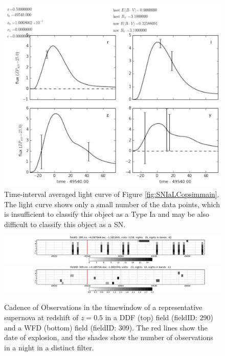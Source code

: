 \begin{figure}[tbh!]
\includegraphics[angle=0,width=0.99\hsize:,clip]{figs/SN_309_lcavg.pdf}
\caption{Time-interval averaged light curve of Figure \ref{fig:SNIaLCopsimmain}.
The light curve shows only a small number of the data points, which is insufficient
to classify this object as a Type Ia and may be also difficult to classify this object as
a SN. 
}
\label{fig:SNIaLCopsimmain2}
\end{figure}



\begin{figure}[tbh!]
\includegraphics[angle=0,width=\textwidth,clip]{figs/SN_Cadence_290.pdf}
\includegraphics[angle=0,width=\textwidth,clip]{figs/SN_Cadence_309.pdf}
\caption{Cadence of Observations in the timewindow of a representative supernova at redshift of $z=0.5$ in a DDF (top) field (fieldID: 290) and a WFD (bottom) field (fieldID: 309). The red lines show the date of explosion, and the shades show the number of observations in a night in a distinct filter.}
\label{fig:perSNCadence}
\end{figure}



